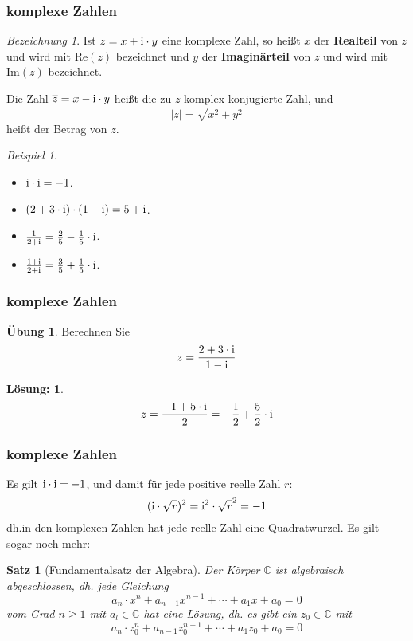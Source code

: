 \documentclass[hyperref={pdfpagelabels=false}]{beamer}
\theoremstyle{plain}%
\newtheorem*{satz}{Satz}
\theoremstyle{definition}
\newtheorem*{uebung}{Übung}
\newtheorem*{sol}{Lösung:}
\theoremstyle{remark}
\newtheorem*{beispiel}{Beispiel}
\newtheorem*{bez}{Bezeichnung}
\def \ii{{\relax\ifmmode \mathrm{i} \else i \fi}}
\def \C{\mathbb C}
\begin{document}
\begin{frame}
\frametitle{komplexe Zahlen}

\begin{bez}
Ist $z = x+\ii \cdot y$ eine komplexe Zahl, so heißt $x$ der \textbf{Realteil} von $z$ und wird mit $\mathrm{Re}(z)$ 
bezeichnet und $y$ der \textbf{Imaginärteil} von $z$ und wird mit $\mathrm{Im}(z)$ 
bezeichnet.

\pause 

Die Zahl $\overline{z} = x - \ii \cdot y$ heißt die zu $z$ komplex konjugierte Zahl, und 
	$$ \vert z \vert = \sqrt{x^2+y^2} $$
heißt der Betrag von $z$.  
\end{bez}

\pause 

\begin{beispiel}
\begin{itemize}
\item<3-> $\ii \cdot \ii = -1$.
\item<4-> $(2+3 \cdot \ii) \cdot (1- \ii) = 5 + \ii$.
\item<5-> $\frac {1}{2+\ii} = \frac {2}{5} - \frac {1}{5} \cdot \ii$.  
\item<6-> $\frac {1+\ii}{2+\ii} = \frac {3}{5} + \frac {1}{5} \cdot \ii$.
\end{itemize}
\end{beispiel}
\end{frame}

\begin{frame}
\frametitle{komplexe Zahlen}
\begin{uebung}
Berechnen Sie 
	$$ z = \frac {2+3\cdot \ii}{1 - \ii} $$
\end{uebung}

\bigbreak

\pause \pause

\begin{sol}
 	$$ z =  \frac {-1+5 \cdot \ii}{2} = - \frac {1}{2} + \frac {5}{2} \cdot \ii $$
\end{sol}

\end{frame}

\begin{frame}
\frametitle{komplexe Zahlen}

Es gilt $\ii \cdot \ii = -1$, und damit für jede positive reelle Zahl $r$: 
	$$ (\ii \cdot \sqrt{r})^2 = \ii^2 \cdot \sqrt{r}^2 = -1 $$
dh.in den komplexen Zahlen hat jede reelle Zahl eine Quadratwurzel. Es gilt sogar noch mehr: 

\pause 

\begin{satz}[Fundamentalsatz der Algebra]
Der Körper $\C$ ist algebraisch abgeschlossen, dh. jede Gleichung 
	$$  a_n \cdot x^n + a_{n-1} x^{n-1} + \cdots + a_1 x + a_0 = 0 $$  
vom Grad $n \geq 1$ mit $a_l \in \C$ hat eine Lösung, dh. es gibt ein $z_0 \in \C$ mit  
	$$  a_n \cdot z_0^n + a_{n-1} z_0^{n-1} + \cdots + a_1 z_0 + a_0 = 0 $$  
\end{satz}

\end{frame}
\end{document}
